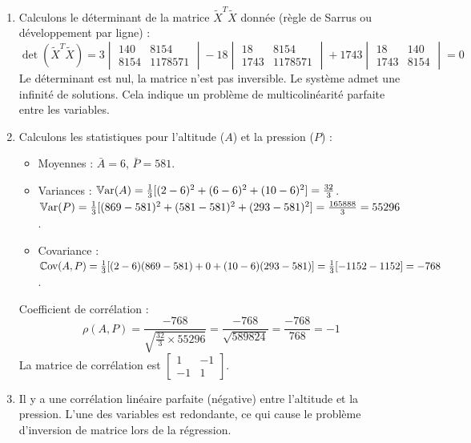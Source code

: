 \documentclass[solutions]{../exercices}
\begin{document}
\begin{solution}
    \begin{enumerate}
        \item Calculons le déterminant de la matrice $\tilde{X}^T \tilde{X}$ donnée (règle de Sarrus ou développement par ligne) :
        \[
            \det(\tilde{X}^T \tilde{X}) = 3 \begin{vmatrix} 140 & 8154 \\ 8154 & 1178571 \end{vmatrix} - 18 \begin{vmatrix} 18 & 8154 \\ 1743 & 1178571 \end{vmatrix} + 1743 \begin{vmatrix} 18 & 140 \\ 1743 & 8154 \end{vmatrix} = 0
        \]
        Le déterminant est nul, la matrice n'est pas inversible. Le système admet une infinité de solutions. Cela indique un problème de multicolinéarité parfaite entre les variables.

        \item Calculons les statistiques pour l'altitude ($A$) et la pression ($P$) :
        \begin{itemize}
            \item Moyennes : $\bar{A} = 6$, $\bar{P} = 581$.
            \item Variances :
            $\mathbb{V}\mathrm{ar}(A) = \frac{1}{3} [(2-6)^2 + (6-6)^2 + (10-6)^2] = \frac{32}{3}$.
            $\mathbb{V}\mathrm{ar}(P) = \frac{1}{3} [(869-581)^2 + (581-581)^2 + (293-581)^2] = \frac{165888}{3} = 55296$.
            \item Covariance :
            $\mathbb{C}\mathrm{ov}(A, P) = \frac{1}{3} [(2-6)(869-581) + 0 + (10-6)(293-581)] = \frac{1}{3} [-1152 - 1152] = -768$.
        \end{itemize}
        Coefficient de corrélation :
        \[
            \rho(A, P) = \frac{-768}{\sqrt{\frac{32}{3} \times 55296}} = \frac{-768}{\sqrt{589824}} = \frac{-768}{768} = -1
        \]
        La matrice de corrélation est $\begin{bmatrix} 1 & -1 \\ -1 & 1 \end{bmatrix}$.

        \item Il y a une corrélation linéaire parfaite (négative) entre l'altitude et la pression. L'une des variables est redondante, ce qui cause le problème d'inversion de matrice lors de la régression.


\end{enumerate}
\end{solution}
\end{document}

